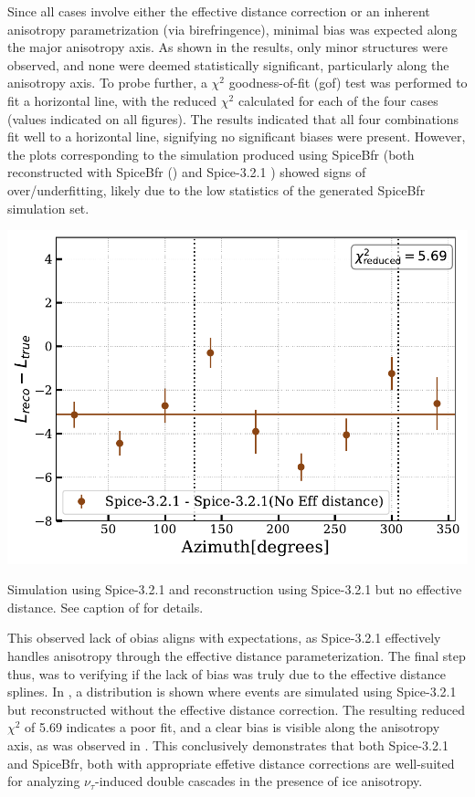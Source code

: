 Since all cases involve either the effective distance correction or an inherent anisotropy parametrization (via birefringence), minimal bias was expected along the major anisotropy axis. As shown in the results, only minor structures were observed, and none were deemed statistically significant, particularly along the anisotropy axis. To probe further, a $\chi^2$ goodness-of-fit (gof) test was performed to fit a horizontal line, with the reduced $\chi^2$ calculated for each of the four cases (values indicated on all figures). The results indicated that all four combinations fit well to a horizontal line, signifying no significant biases were present. However, the plots corresponding to the simulation produced using SpiceBfr (both reconstructed with SpiceBfr () and Spice-3.2.1 ) showed signs of over/underfitting, likely due to the low statistics of the generated SpiceBfr simulation set. 

\begin{marginfigure}
    
    \includegraphics{./figures/EventSample/Lbias_spicenoeffdist.pdf}
    \caption{Simulation using Spice-3.2.1 and reconstruction using Spice-3.2.1 but no effective distance. See caption of  for details.}
\end{marginfigure}

This observed lack of obias aligns with expectations, as Spice-3.2.1 effectively handles anisotropy through the effective distance parameterization. The final step thus, was to verifying if the lack of bias was truly due to the effective distance splines. In , a distribution is shown where events are simulated using Spice-3.2.1 but reconstructed without the effective distance correction. The resulting reduced $\chi^2$ of 5.69 indicates a poor fit, and a clear bias is visible along the anisotropy axis, as was observed in \cite{marcel_thesis}. This conclusively demonstrates that both Spice-3.2.1 and SpiceBfr, both with appropriate effetive distance corrections are well-suited for analyzing $\nu_{\tau}$-induced double cascades in the presence of ice anisotropy.

